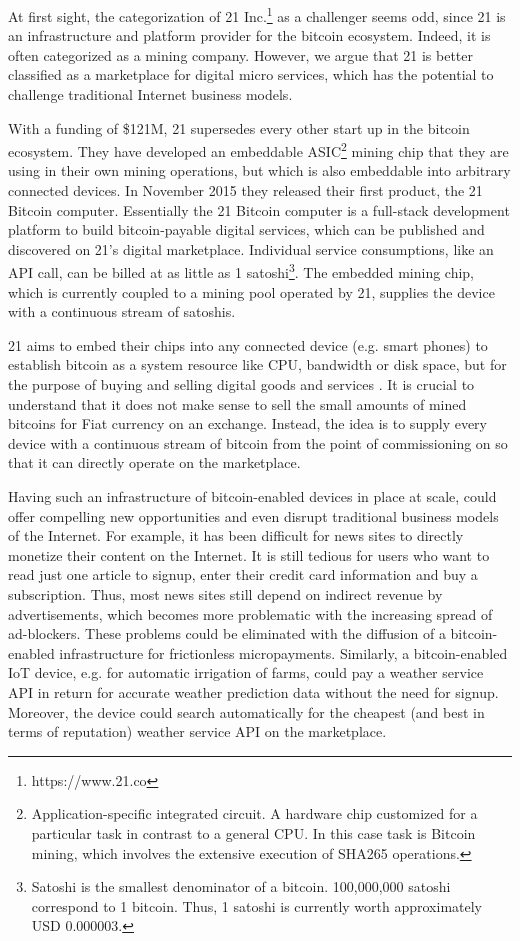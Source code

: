 {At first sight, the categorization of 21 Inc.\footnote{https://www.21.co} as a challenger seems odd, 
since 21 is an infrastructure and platform provider for the bitcoin ecosystem. 
Indeed, it is often categorized as a mining company. However, we argue that 21 
is better classified as a marketplace for digital micro services, which has the 
potential to challenge traditional Internet business models.

With a funding of \$121M, 21 supersedes every other start up in the bitcoin ecosystem. 
They have developed an embeddable ASIC\footnote{ Application-specific integrated 
circuit. A hardware chip customized for a particular task in contrast to a general 
CPU. In this case task is Bitcoin mining, which involves the extensive execution 
of SHA265 operations.} mining chip that they are using in their own mining operations, 
but which is also embeddable into arbitrary connected devices. In November 2015 
they released their first product, the 21 Bitcoin computer. Essentially the 21 
Bitcoin computer is a full-stack development platform to build bitcoin-payable 
digital services, which can be published and discovered on 21's digital marketplace. 
Individual service consumptions, like an API call, can be billed at as little as 
1 satoshi\footnote{Satoshi is the smallest denominator of a bitcoin. 100,000,000 
satoshi correspond to 1 bitcoin. Thus, 1 satoshi is currently worth approximately 
USD 0.000003.}. The embedded mining chip, which is currently coupled to a mining 
pool operated by 21, supplies the device with 
a continuous stream of satoshis.

21 aims to embed their chips into any connected device (e.g. smart phones) to establish 
bitcoin as a system resource like CPU, bandwidth or disk space, but for the purpose 
of buying and selling digital goods and services \parencite{Balaji2015}. It is crucial 
to understand that it does not make sense to sell the small amounts of mined bitcoins 
for Fiat currency on an exchange. Instead, the idea is to supply every device with 
a continuous stream of bitcoin from the point of commissioning on so that it can 
directly operate on the marketplace. 

Having such an infrastructure of bitcoin-enabled devices in place at scale, could 
offer compelling new opportunities and even disrupt traditional business models 
of the Internet. For example, it has been difficult for news sites to directly 
monetize their content on the Internet. It is still tedious for users who want 
to read just one article to signup, enter their credit card information and buy 
a subscription. Thus, most news sites still depend on indirect revenue by advertisements, 
which becomes more problematic with the increasing spread of ad-blockers. These 
problems could be eliminated with the diffusion of a bitcoin-enabled infrastructure 
for frictionless micropayments. Similarly, a bitcoin-enabled IoT device, e.g. for 
automatic irrigation of farms, could pay a weather service API in return for accurate 
weather prediction data without the need for signup. Moreover, the device could 
search automatically for the cheapest (and best in terms of reputation) weather 
service API on the marketplace.

}
